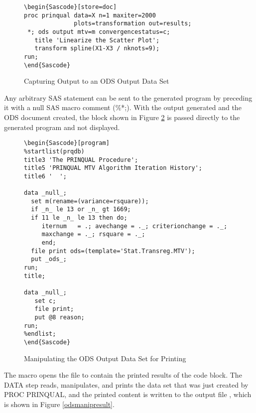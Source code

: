 \documentclass[article,oneside]{memoir}
\begin{document}
\begin{figure}[H]
\begin{snugshade}
\begin{verbatim}
\begin{Sascode}[store=doc]
proc prinqual data=X n=1 maxiter=2000 
              plots=transformation out=results;
 *; ods output mtv=m convergencestatus=c;
   title 'Linearize the Scatter Plot';
   transform spline(X1-X3 / nknots=9);
run;
\end{Sascode}
\end{verbatim}
\end{snugshade}
\caption{Capturing Output to an ODS Output Data Set}\label{odsdataset}
\end{figure}

  Any arbitrary SAS statement can be sent to the generated program by preceding
  it with a null SAS macro comment (\%*;).
  With the output generated and the ODS document  created, 
  the  block shown in Figure \ref{odsmanip} is passed directly
  to the generated program and not displayed. 
  
\begin{figure}[H]
\begin{snugshade}
\begin{verbatim}
\begin{Sascode}[program]
%startlist(prqdb)
title3 'The PRINQUAL Procedure';
title5 'PRINQUAL MTV Algorithm Iteration History';
title6 '  ';

data _null_;
  set m(rename=(variance=rsquare));
  if _n_ le 13 or _n_ gt 1669;
  if 11 le _n_ le 13 then do;
     iternum   = .; avechange = ._; criterionchange = ._;
     maxchange = ._; rsquare = ._;
     end;
  file print ods=(template='Stat.Transreg.MTV');
  put _ods_;
run;
title;

data _null_;
   set c;
   file print;
   put @8 reason;
run;
%endlist;
\end{Sascode}
\end{verbatim}
\end{snugshade}
\caption{Manipulating the ODS Output Data Set for Printing}\label{odsmanip}
\end{figure}

  The  macro opens the file  
   to contain the printed results of the code block.
  The DATA step reads, manipulates, and prints the data set  
  that was just created by PROC PRINQUAL, and the printed content is written to the 
  output file , which is shown in Figure \ref{odsmanipresult}.
\end{document}
